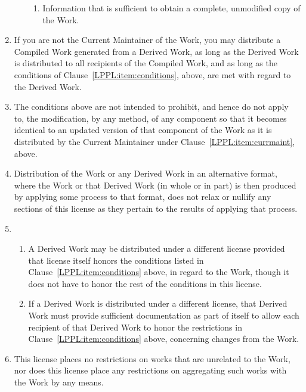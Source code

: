 \begin{LPPLicense}
\begin{enumerate}
\begin{enumerate}
\begin{enumerate}
      \item Information that is sufficient to obtain a complete,
        unmodified copy of the Work.
      \end{enumerate}
    \end{enumerate}
  \item If you are not the Current Maintainer of the Work, you may
    distribute a Compiled Work generated from a Derived Work, as long
    as the Derived Work is distributed to all recipients of the
    Compiled Work, and as long as the conditions of
    Clause~\ref{LPPL:item:conditions}, above, are met with regard to the Derived
    Work.

  \item The conditions above are not intended to prohibit, and hence
    do not apply to, the modification, by any method, of any component
    so that it becomes identical to an updated version of that
    component of the Work as it is distributed by the Current
    Maintainer under Clause~\ref{LPPL:item:currmaint}, above.

  \item Distribution of the Work or any Derived Work in an alternative
    format, where the Work or that Derived Work (in whole or in part)
    is then produced by applying some process to that format, does not
    relax or nullify any sections of this license as they pertain to
    the results of applying that process.
     
  \item \null
    \begin{enumerate}
    \item A Derived Work may be distributed under a different license
      provided that license itself honors the conditions listed in
      Clause~\ref{LPPL:item:conditions} above, in regard to the Work, though it
      does not have to honor the rest of the conditions in this
      license.
      
    \item If a Derived Work is distributed under a different license,
      that Derived Work must provide sufficient documentation as part
      of itself to allow each recipient of that Derived Work to honor
      the restrictions in Clause~\ref{LPPL:item:conditions} above, concerning
      changes from the Work.
    \end{enumerate}
  \item This license places no restrictions on works that are
    unrelated to the Work, nor does this license place any
    restrictions on aggregating such works with the Work by any means.


\end{enumerate}
\end{LPPLicense}
